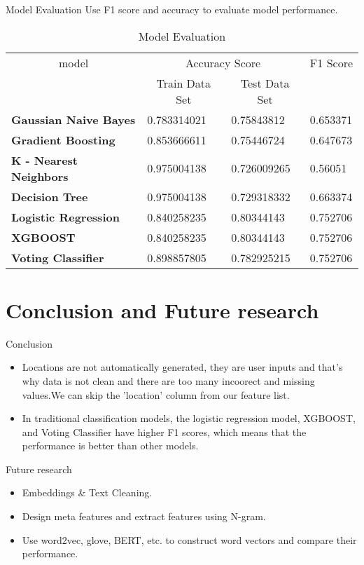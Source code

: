\documentclass[
 size=12pt,
 paper=smartboard, %
 mode=present, %
 display=slides, %
 style=tuliplab,  %
 pauseslide,
 fleqn,leqno,clock]{powerdot}
\begin{document}
\begin{slide}{Model Evaluation}
	Use F1 score and accuracy to evaluate model performance.
\begin{table}[htbp]
	\centering
	\caption{Model Evaluation}
	\begin{tabular}{llll}
		\toprule
		\multicolumn{1}{c}{model} & \multicolumn{2}{c}{Accuracy Score} & \multicolumn{1}{c}{F1 Score} \\
		& \multicolumn{1}{c}{Train Data Set} & \multicolumn{1}{c}{Test Data Set} &  \\
		\midrule
		\textbf{Gaussian Naive Bayes} & 0.783314021 & 0.75843812 & 0.653371 \\
		\textbf{Gradient Boosting} & 0.853666611 & 0.75446724 & 0.647673 \\
		\textbf{K - Nearest Neighbors} & 0.975004138 & 0.726009265 & 0.56051 \\
		\textbf{Decision Tree} & 0.975004138 & 0.729318332 & 0.663374 \\
		\textbf{Logistic Regression} & 0.840258235 & 0.80344143 & 0.752706 \\
		\textbf{XGBOOST} & 0.840258235 & 0.80344143 & 0.752706 \\
		\textbf{Voting Classifier} & 0.898857805 & 0.782925215 & 0.752706 \\
	\end{tabular}%
\end{table}%
\end{slide}


\section{Conclusion and Future research}
\begin{slide}{Conclusion}
  \begin{itemize}
    \item 	Locations are not automatically generated, they are user inputs and that's why data is not clean and there are too many incoorect and missing values.We can skip the 'location' column from our feature list.
          \bigskip
    \item In traditional classification models, the logistic regression model, XGBOOST, and Voting Classifier have higher F1 scores, which means that the performance is better than other models.
  \end{itemize}
\end{slide}

\begin{slide}{Future research}
  \begin{itemize}
    \item Embeddings \& Text Cleaning.
    \item Design meta features and extract features using N-gram.
    \item Use word2vec, glove, BERT, etc. to construct word vectors and compare their performance.
  \end{itemize}
\end{slide}
\end{document}
